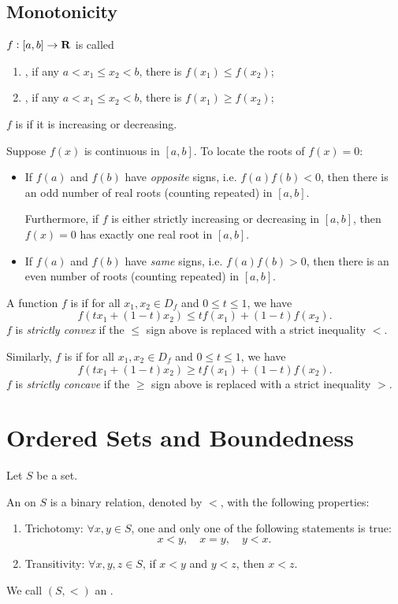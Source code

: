 \subsection{Monotonicity}
\begin{definition}[Monotonicity]
$f:[a,b]\to\mathbf R$ is called
\begin{enumerate}[label=(\roman*)]
\item {}, if any $a<x_1\le x_2<b$, there is $f(x_1)\le f(x_2)$;
\item {}, if any $a<x_1\le x_2<b$, there is $f(x_1)\ge f(x_2)$;
\end{enumerate}
$f$ is  if it is increasing or decreasing.
\end{definition}

Suppose $f(x)$ is continuous in $[a,b]$. To locate the roots of $f(x)=0$:
\begin{itemize}
\item If $f(a)$ and $f(b)$ have \emph{opposite} signs, i.e. $f(a)f(b)<0$, then there is an odd number of real roots (counting repeated) in $[a,b]$.

Furthermore, if $f$ is either strictly increasing or decreasing in $[a,b]$, then $f(x)=0$ has exactly one real root in $[a,b]$.

\item If $f(a)$ and $f(b)$ have \emph{same} signs, i.e. $f(a)f(b)>0$, then there is an even number of roots (counting repeated) in $[a,b]$.
\end{itemize}

\begin{definition}[Convexity]
A function $f$ is  if for all $x_1,x_2\in D_f$ and $0\le t\le 1$, we have
\[ f(tx_1+(1-t)x_2)\le tf(x_1)+(1-t)f(x_2).\]
$f$ is \emph{strictly convex} if the $\le$ sign above is replaced with a strict inequality $<$.

Similarly, $f$ is  if for all $x_1,x_2\in D_f$ and $0\le t\le 1$, we have
\[ f(tx_1+(1-t)x_2)\ge tf(x_1)+(1-t)f(x_2). \]
$f$ is \emph{strictly concave} if the $\ge$ sign above is replaced with a strict inequality $>$.
\end{definition}
\pagebreak

\section{Ordered Sets and Boundedness}
Let $S$ be a set.
\begin{definition}[Order]
An  on $S$ is a binary relation, denoted by $<$, with the following properties:
\begin{enumerate}[label=(\roman*)]
\item Trichotomy: $\forall x,y \in S$, one and only one of the following statements is true:
\[x<y,\quad x=y,\quad y<x.\]
\item Transitivity: $\forall x,y,z \in S$, if $x<y$ and $y<z$, then $x<z$.
\end{enumerate}
We call $(S,<)$ an .
\end{definition}


